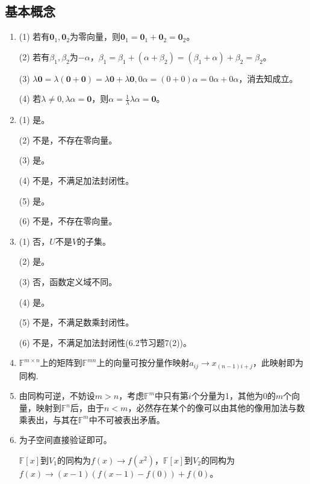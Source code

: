 \documentclass[a4paper,UTF8,fontset=windows]{ctexart}
\begin{document}
\subsection{基本概念}
\begin{enumerate}
\item 
(1) 若有$\mathbf{0}_1,\mathbf{0}_2$为零向量，则$\mathbf{0}_1=\mathbf{0}_1+\mathbf{0}_2=\mathbf{0}_2$。

(2) 若有$\beta_1,\beta_2$为$-\alpha$，$\beta_1=\beta_1+(\alpha+\beta_2)=(\beta_1+\alpha)+\beta_2=\beta_2$。

(3) $\lambda\mathbf{0}=\lambda(\mathbf{0}+\mathbf{0})=\lambda\mathbf{0}+\lambda\mathbf{0},0\alpha=(0+0)\alpha=0\alpha+0\alpha$，消去知成立。

(4) 若$\lambda\ne0,\lambda\alpha=\mathbf{0}$，则$\alpha=\frac{1}{\lambda}\lambda\alpha=\mathbf{0}$。

\item
(1) 是。

(2) 不是，不存在零向量。

(3) 是。

(4) 不是，不满足加法封闭性。

(5) 是。

(6) 不是，不存在零向量。

\item
(1) 否，$U$不是$V$的子集。

(2) 是。

(3) 否，函数定义域不同。

(4) 是。

(5) 不是，不满足数乘封闭性。

(6) 不是，不满足加法封闭性(6.2节习题7(2))。

\item
$\mathbb{F}^{m\times n}$上的矩阵到$\mathbb{F}^{mn}$上的向量可按分量作映射$a_{ij}\to x_{(n-1)i+j}$，此映射即为同构.

\item
由同构可逆，不妨设$m>n$，考虑$\mathbb{F}^m$中只有第$i$个分量为1，其他为0的$m$个向量，映射到$\mathbb{F}^n$后，由于$n<m$，必然存在某个的像可以由其他的像用加法与数乘表出，与其在$\mathbb{F}^m$中不可被表出矛盾。

\item
为子空间直接验证即可。

$\mathbb{F}[x]$到$V_1$的同构为$f(x)\to f(x^2)$，$\mathbb{F}[x]$到$V_2$的同构为$f(x)\to (x-1)(f(x-1)-f(0))+f(0)$。
\end{enumerate}
\end{document}
